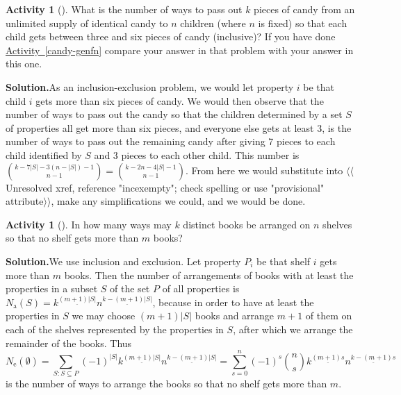 \documentclass[10pt,]{book}
\theoremstyle{plain}
\theoremstyle{definition}
\newtheorem{activity}[project]{Activity}
\numberwithin{equation}{chapter}
\begin{document}
\begin{activity}[]\label{activity-242}
What is the number of ways to pass out \(k\) pieces of candy from an unlimited supply of identical candy to \(n\) children (where \(n\) is fixed) so that each child gets between three and six pieces of candy (inclusive)? If you have done \hyperref[candy-genfn]{Activity~\ref{candy-genfn}} compare your answer in that problem with your answer in this one.%
\par\medskip\noindent%
\textbf{Solution.}\quad As an inclusion-exclusion problem, we would let property \(i\) be that child \(i\) gets more than six pieces of candy. We would then observe that the number of ways to pass out the candy so that the children determined by a set \(S\) of properties all get more than six pieces, and everyone else gets at least 3, is the number of ways to pass out the remaining candy after giving 7 pieces to each child identified by \(S\) and 3 pieces to each other child. This number is \(\binom{k-7|S|-3(n-|S|)-1}{n-1}=\binom{k-2n-4|S|-1}{n-1}\). From here we would substitute into {$\langle\langle$Unresolved xref, reference "incexempty"; check spelling or use "provisional" attribute$\rangle\rangle$}, make any simplifications we could, and we would be done.%
\end{activity}
\begin{activity}[]\label{activity-243}
In how many ways may \(k\) distinct books be arranged on \(n\) shelves so that no shelf gets more than \(m\) books?%
\par\medskip\noindent%
\textbf{Solution.}\quad We use inclusion and exclusion. Let property \(P_i\) be that shelf \(i\) gets more than \(m\) books. Then the number of arrangements of books with at least the properties in a subset \(S\) of the set \(P\) of all properties is \(N_{\mbox{a} }(S) = k^{\underline{(m+1)|S|}}n^{\underline{k-(m+1)|S|}}\), because in order to have at least the properties in \(S\) we may choose \((m+1)|S|\) books and arrange \(m+1\) of them on each of the shelves represented by the properties in \(S\), after which we arrange the remainder of the books. Thus%
\begin{equation*}
N_{\mbox{e} }(\emptyset)=\sum_{S:S\subseteq P} (-1)^{|S|}
k^{\underline{(m+1)|S|}}n^{\underline{k-(m+1)|S|}}=\sum_{s=0}^n
(-1)^s\binom{n}{s}k^{\underline{(m+1)s}}n^{\underline{k-(m+1)s}}
\end{equation*}
is the number of ways to arrange the books so that no shelf gets more than \(m\).%
\end{activity}
\end{document}
